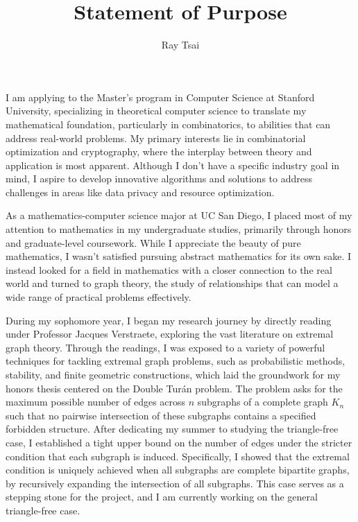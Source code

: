 \documentclass[12pt]{article}
\title{Statement of Purpose}
\author{Ray Tsai}
\date{}
\begin{document}
\maketitle

\vspace{-0.25in}

I am applying to the Master's program in Computer Science at Stanford University, specializing in
theoretical computer science to translate my mathematical foundation, particularly in combinatorics,
to abilities that can address real-world problems. My primary interests lie in combinatorial
optimization and cryptography, where the interplay between theory and application is most apparent.
Although I don't have a specific industry goal in mind, I aspire to develop innovative algorithms
and solutions to address challenges in areas like data privacy and resource optimization.

As a mathematics-computer science major at UC San Diego, I placed most of my attention to
mathematics in my undergraduate studies, primarily through honors and graduate-level coursework.
While I appreciate the beauty of pure mathematics, I wasn't satisfied pursuing abstract mathematics
for its own sake. I instead looked for a field in mathematics with a closer connection to the real
world and turned to graph theory, the study of relationships that can model a wide range of
practical problems effectively.

During my sophomore year, I began my research journey by directly reading under Professor Jacques
Verstraete, exploring the vast literature on extremal graph theory. Through the readings, I was
exposed to a variety of powerful techniques for tackling extremal graph problems, such as
probabilistic methods, stability, and finite geometric constructions, which laid the groundwork for
my honors thesis centered on the Double Turán problem. The problem asks for the maximum possible
number of edges across $n$ subgraphs of a complete graph $K_n$ such that no pairwise intersection of
these subgraphs contains a specified forbidden structure. After dedicating my summer to studying the
triangle-free case, I established a tight upper bound on the number of edges under the stricter
condition that each subgraph is induced. Specifically, I showed that the extremal condition is
uniquely achieved when all subgraphs are complete bipartite graphs, by recursively expanding the
intersection of all subgraphs. This case serves as a stepping stone for the project, and I am
currently working on the general triangle-free case. 
\end{document}
